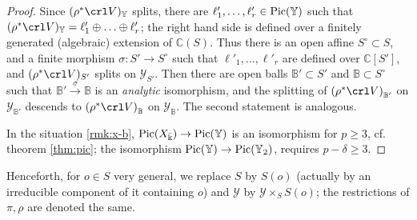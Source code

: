 \documentclass[11pt,reqno]{amsart}
\let\cal\mathcal
\let\mbb\mathbb
\let\nit\noindent
\let\srel\stackrel
\numberwithin{equation}{section}
\numberwithin{figure}{section}
\let\si\sigma
\let\ges\geqslant
\begin{document}
 
\begin{proof}
Since $(\rho^*\crl V)_{{\mbb Y}}$ splits, there are $\ell'_1,\ldots,\ell'_r\in{\mathop{\rm Pic}\nolimits}({{\mbb Y}})$ 
such that $(\rho^*\crl V)_{{\mbb Y}}=\ell'_1\oplus\ldots\oplus\ell'_r$; 
the right hand side is defined over a finitely generated (algebraic) extension of ${{\mbb C}}(S)$. 
Thus there is an open affine $S^\circ\subset S$, and a finite morphism $\si:S'\to S^\circ$ 
such that $\ell'_1,\ldots,\ell'_r$ are defined over ${{\mbb C}}[S']$, and $(\rho^*\crl V)_{S'}$ 
splits on ${{\cal Y}}_{S'}$. 
Then there are open balls ${{\mbb B}}'\subset S'$ and ${{\mbb B}}\subset S^\circ$ such that 
${{\mbb B}}'\srel{\si}{\to}{{\mbb B}}$ is an {\em analytic} isomorphism, and the splitting of 
${(\rho^*\crl V)}_{{{\mbb B}}'}$ on ${{\cal Y}}_{{{\mbb B}}'}$ descends to ${(\rho^*\crl V)}_{{\mbb B}}$ 
on ${{\cal Y}}_{{\mbb B}}$. The second statement is analogous. 

In the situation \ref{rmk:x-b}, ${\mathop{\rm Pic}\nolimits}(X_{\bar\Bbbk})\to{\mathop{\rm Pic}\nolimits}({{\mbb Y}})$ 
is an isomorphism for $p\ges 3$, cf. theorem \ref{thm:pic}; 
the isomorphism ${\mathop{\rm Pic}\nolimits}({{\mbb Y}})\to{\mathop{\rm Pic}\nolimits}({{\mbb Y}}_2)$, requires $p-\delta\ges 3$. 
\end{proof}

Henceforth, for $o\in S$ very general, we replace $S$ by $S(o)$ 
(actually by an irreducible component of it containing $o$) 
and ${{\cal Y}}$ by ${{\cal Y}}\times_S{S(o)}$; 
the restrictions of $\pi,\rho$ are denoted the same. 
\end{document}
